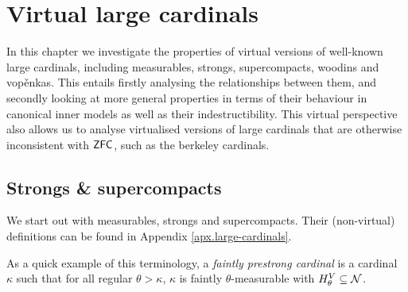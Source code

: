 \documentclass[../../main]{subfiles}
\begin{document}
\chapter{Virtual large cardinals}
\thispagestyle{fancy}

In this chapter we investigate the properties of virtual versions of well-known large cardinals, including measurables, strongs, supercompacts, woodins and vop\v enkas. This entails firstly analysing the relationships between them, and secondly looking at more general properties in terms of their behaviour in canonical inner models as well as their indestructibility. This virtual perspective also allows us to analyse virtualised versions of large cardinals that are otherwise inconsistent with $\textsf{ZFC}$, such as the berkeley cardinals.


\section{Strongs \& supercompacts}

We start out with measurables, strongs and supercompacts. Their (non-virtual) definitions can be found in Appendix \ref{apx.large-cardinals}.


As a quick example of this terminology, a \textit{faintly prestrong cardinal} is a cardinal $\kappa$ such that for all regular $\theta>\kappa$, $\kappa$ is faintly $\theta$-measurable with $H_\theta^V\subseteq\operatorname{\mathcal N}$.
\end{document}
